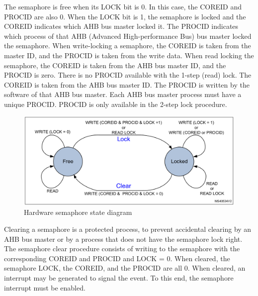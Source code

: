 The semaphore is free when its LOCK bit is 0. In this case, the COREID and PROCID are also 0. When the LOCK bit is 1, the semaphore is locked and the COREID indicates which AHB bus master locked it. The PROCID indicates which process of that AHB (Advanced High-performance Bus) bus master locked the semaphore. When write-locking a semaphore, the COREID is taken from the master ID, and the PROCID is taken from the write data. When read locking the semaphore, the COREID is taken from the AHB bus master ID, and the PROCID is zero. There is no PROCID available with the 1-step (read) lock. The COREID is taken from the AHB bus master ID. The PROCID is written by the software of that AHB bus master. Each AHB bus master process must have a unique PROCID. PROCID is only available in the 2-step lock procedure.

\begin{figure}[!ht]
    \centering
    \includegraphics[width=150mm, keepaspectratio]{figures/hw-semaphore.png}
    \caption{Hardware semaphore state diagram \cite{HWSemaphore}}
    \label{fig:HWSemaphore}
\end{figure}

Clearing a semaphore is a protected process, to prevent accidental clearing by an AHB bus master or by a process that does not have the semaphore lock right. The semaphore clear procedure consists of writing to the semaphore with the corresponding COREID and PROCID and LOCK = 0. When cleared, the semaphore LOCK, the COREID, and the PROCID are all 0. When cleared, an interrupt may be generated to signal the event. To this end, the semaphore interrupt must be enabled.
